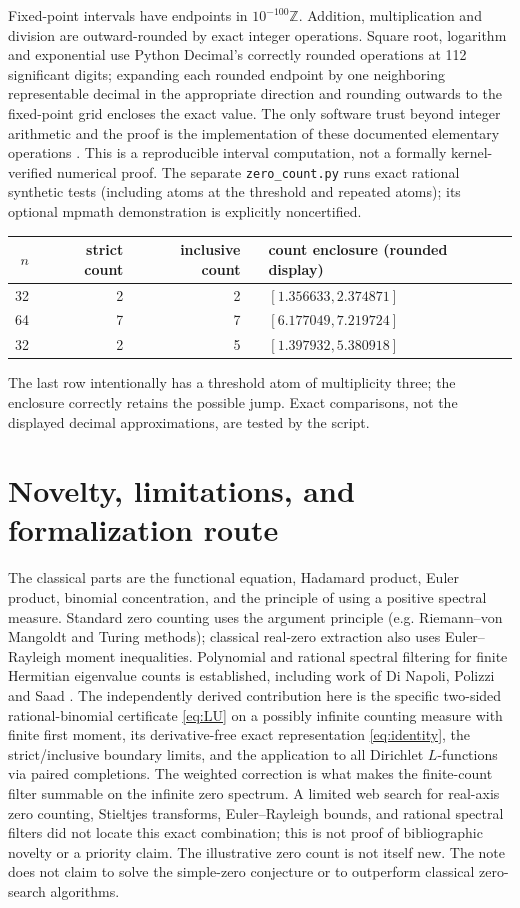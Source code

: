 \documentclass[11pt]{article}
\theoremstyle{remark}\newtheorem{remark}[theorem]{Remark}
\newcommand{\Z}{\mathbb Z}
\begin{document}
Fixed-point intervals have endpoints in $10^{-100}\Z$. Addition, multiplication and division are outward-rounded by exact integer operations. Square root, logarithm and exponential use Python Decimal's correctly rounded operations at 112 significant digits; expanding each rounded endpoint by one neighboring representable decimal in the appropriate direction and rounding outwards to the fixed-point grid encloses the exact value. The only software trust beyond integer arithmetic and the proof is the implementation of these documented elementary operations \cite{decimal}. This is a reproducible interval computation, not a formally kernel-verified numerical proof. The separate \texttt{zero\_count.py} runs exact rational synthetic tests (including atoms at the threshold and repeated atoms); its optional mpmath demonstration is explicitly noncertified.

\begin{center}
\begin{tabular}{rrrrl}
\toprule
$n$ & strict count & inclusive count & & count enclosure (rounded display)\\
\midrule
32 & 2 & 2 && $[1.356633,2.374871]$\\
64 & 7 & 7 && $[6.177049,7.219724]$\\
32 & 2 & 5 && $[1.397932,5.380918]$\\
\bottomrule
\end{tabular}
\end{center}
The last row intentionally has a threshold atom of multiplicity three; the enclosure correctly retains the possible jump. Exact comparisons, not the displayed decimal approximations, are tested by the script.

\section{Novelty, limitations, and formalization route}
The classical parts are the functional equation, Hadamard product, Euler product, binomial concentration, and the principle of using a positive spectral measure. Standard zero counting uses the argument principle (e.g. Riemann--von Mangoldt and Turing methods); classical real-zero extraction also uses Euler--Rayleigh moment inequalities. Polynomial and rational spectral filtering for finite Hermitian eigenvalue counts is established, including work of Di Napoli, Polizzi and Saad \cite{dinapoli}. The independently derived contribution here is the specific two-sided rational-binomial certificate \eqref{eq:LU} on a possibly infinite counting measure with finite first moment, its derivative-free exact representation \eqref{eq:identity}, the strict/inclusive boundary limits, and the application to all Dirichlet $L$-functions via paired completions. The weighted correction is what makes the finite-count filter summable on the infinite zero spectrum. A limited web search for real-axis zero counting, Stieltjes transforms, Euler--Rayleigh bounds, and rational spectral filters did not locate this exact combination; this is not proof of bibliographic novelty or a priority claim. The illustrative zero count is not itself new. The note does not claim to solve the simple-zero conjecture or to outperform classical zero-search algorithms.
\end{document}
